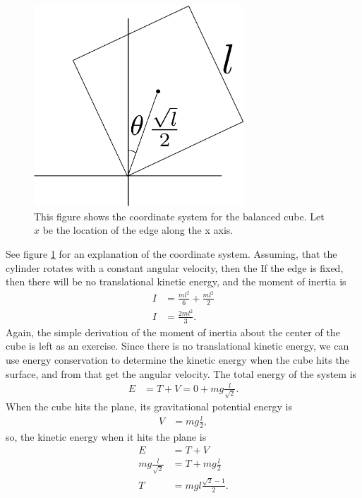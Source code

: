 \documentclass[10pt]{article}
\begin{document}
\begin{figure}[h!]
    \centering
    \includegraphics[width=0.7\textwidth]{5Ex29.png}
    \caption{This figure shows the coordinate system for the balanced cube.
    Let $x$ be the location of the edge along the x axis.}
  \label{fig:5-29}
\end{figure}
See figure \ref{fig:5-29} for an explanation of the coordinate system.
Assuming, that the cylinder rotates with a constant angular velocity, then the
If the edge is fixed, then there will be no translational kinetic energy, and
the moment of inertia is 
\begin{align*}
  I &= \frac{ml^2}{6} + \frac{ml^2}{2}\\
  I &= \frac{2ml^2}{3}.
\end{align*}
Again, the simple derivation of the moment of inertia about the center of the 
cube is left as an exercise.  Since there is no translational kinetic energy,
we can use energy conservation to determine the kinetic energy when the 
cube hits the surface, and from that get the angular velocity.  The total 
energy of the system is
\begin{align*}
  E &= T+V = 0+mg\frac{l}{\sqrt{2}}.
\end{align*}
When the cube hits the plane, its gravitational potential energy is
\begin{align*}
  V &= mg\frac{l}{2},
\end{align*}
so, the kinetic energy when it hits the plane is
\begin{align*}
  E &= T+V\\
  mg\frac{l}{\sqrt{2}} &= T + mg\frac{l}{2}\\
  T &= mgl\frac{\sqrt{2}-1}{2}.
\end{align*}
\end{document}
